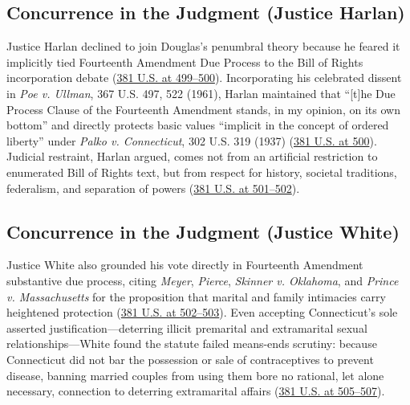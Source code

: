 \documentclass[12pt]{article}
\begin{document}
\subsection{Concurrence in the Judgment (Justice Harlan)}
Justice Harlan declined to join Douglas's penumbral theory because he feared it implicitly tied Fourteenth Amendment Due Process to the Bill of Rights incorporation debate (\href{https://supreme.justia.com/cases/federal/us/381/479/}{381 U.S. at 499--500}). Incorporating his celebrated dissent in \textit{Poe v. Ullman}, 367 U.S. 497, 522 (1961), Harlan maintained that ``[t]he Due Process Clause of the Fourteenth Amendment stands, in my opinion, on its own bottom'' and directly protects basic values ``implicit in the concept of ordered liberty'' under \textit{Palko v. Connecticut}, 302 U.S. 319 (1937) (\href{https://supreme.justia.com/cases/federal/us/381/479/}{381 U.S. at 500}). Judicial restraint, Harlan argued, comes not from an artificial restriction to enumerated Bill of Rights text, but from respect for history, societal traditions, federalism, and separation of powers (\href{https://supreme.justia.com/cases/federal/us/381/479/}{381 U.S. at 501--502}).

\subsection{Concurrence in the Judgment (Justice White)}
Justice White also grounded his vote directly in Fourteenth Amendment substantive due process, citing \textit{Meyer}, \textit{Pierce}, \textit{Skinner v. Oklahoma}, and \textit{Prince v. Massachusetts} for the proposition that marital and family intimacies carry heightened protection (\href{https://supreme.justia.com/cases/federal/us/381/479/}{381 U.S. at 502--503}). Even accepting Connecticut's sole asserted justification---deterring illicit premarital and extramarital sexual relationships---White found the statute failed means-ends scrutiny: because Connecticut did not bar the possession or sale of contraceptives to prevent disease, banning married couples from using them bore no rational, let alone necessary, connection to deterring extramarital affairs (\href{https://supreme.justia.com/cases/federal/us/381/479/}{381 U.S. at 505--507}).
\end{document}
